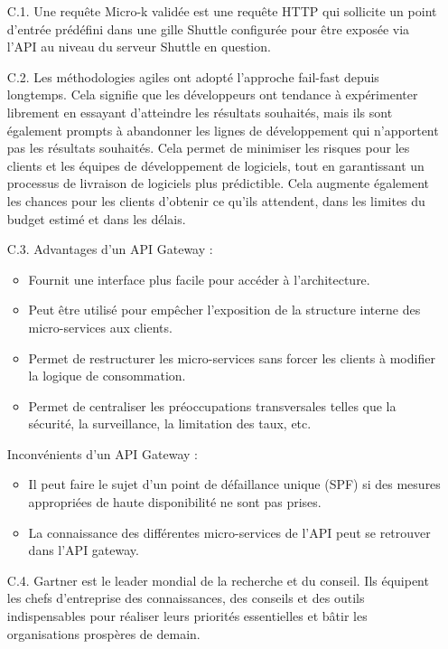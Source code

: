 \begin{itemize}
\item[C.1.] Une requête Micro-k validée est une requête HTTP qui sollicite un point d’entrée prédéfini dans une gille Shuttle configurée pour être exposée via l’API au niveau du serveur Shuttle en question.
\item[C.2.] Les méthodologies agiles ont adopté l’approche fail-fast depuis longtemps. Cela signifie que les développeurs ont tendance à expérimenter librement en essayant d'atteindre les résultats souhaités, mais ils sont également prompts à abandonner les lignes de développement qui n'apportent pas les résultats souhaités. Cela permet de minimiser les risques pour les clients et les équipes de développement de logiciels, tout en garantissant un processus de livraison de logiciels plus prédictible. Cela augmente également les chances pour les clients d'obtenir ce qu'ils attendent, dans les limites du budget estimé et dans les délais.
\item[C.3.] Advantages d’un API Gateway :
    \begin{itemize}
        \item Fournit une interface plus facile pour accéder à l’architecture.
        \item Peut être utilisé pour empêcher l’exposition de la structure interne des micro-services aux clients.
        \item Permet de restructurer les micro-services sans forcer les clients à modifier la logique de consommation.
        \item Permet de centraliser les préoccupations transversales telles que la sécurité, la surveillance, la limitation des taux, etc.
    \end{itemize}
    Inconvénients d’un API Gateway :
    \begin{itemize}
        \item Il peut faire le sujet d’un point de défaillance unique (SPF) si des mesures appropriées de haute disponibilité ne sont pas prises.
        \item La connaissance des différentes micro-services de l’API peut se retrouver dans l’API gateway.
    \end{itemize}
\item[C.4.] Gartner est le leader mondial de la recherche et du conseil. Ils équipent les chefs d’entreprise des connaissances, des conseils et des outils indispensables pour réaliser leurs priorités essentielles et bâtir les organisations prospères de demain.
\end{itemize}
